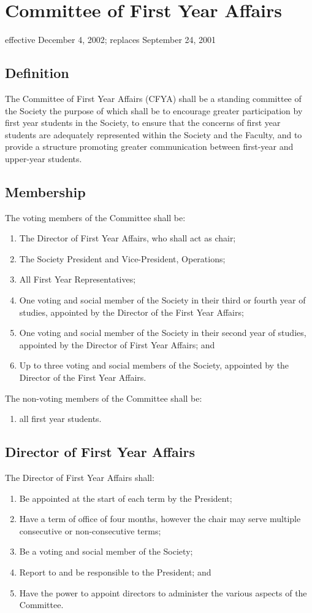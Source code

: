 \section{Committee of First Year Affairs}
effective December 4, 2002; replaces September 24, 2001

\subsection{Definition}
The Committee of First Year Affairs (CFYA) shall be a standing committee of the Society the purpose of which shall be to encourage greater participation by first year students in the Society, to ensure that the concerns of first year students are adequately represented within the Society and the Faculty, and to provide a structure promoting greater communication between first-year and upper-year students.

\subsection{Membership}
The voting members of the Committee shall be:
\begin{enumerate}
\item The Director of First Year Affairs, who shall act as chair;
\item The Society President and Vice-President, Operations;
\item All First Year Representatives;
\item One voting and social member of the Society in their third or fourth year of studies, appointed by the Director of the First Year Affairs;
\item One voting and social member of the Society in their second year of studies, appointed by the Director of First Year Affairs; and
\item Up to three voting and social members of the Society, appointed by the Director of the First Year Affairs.
\end{enumerate}
The non-voting members of the Committee shall be:
\begin{enumerate}
\item all first year students.
\end{enumerate}

\subsection{Director of First Year Affairs}
The Director of First Year Affairs shall:
\begin{enumerate}
\item Be appointed at the start of each term by the President;
\item Have a term of office of four months, however the chair may serve multiple consecutive or non-consecutive terms;
\item Be a voting and social member of the Society;
\item Report to and be responsible to the President; and
\item Have the power to appoint directors to administer the various aspects of the Committee.
\end{enumerate}